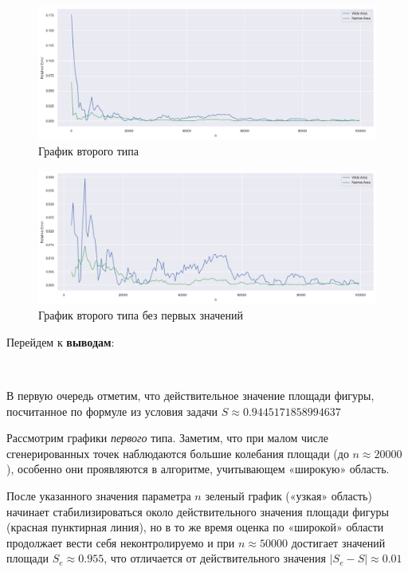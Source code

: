\documentclass[11pt,a4paper]{scrarticle}
\theoremstyle{definition}
\begin{document}
\begin{enumerate}
	      \begin{figure}[htp]
		      \centering
		      \includegraphics[width=\textwidth]{../static/relative_error.png}
		      \caption{График второго типа}
		      \label{fig:relative-error}
	      \end{figure}
	      \FloatBarrier

	      \begin{figure}[htp]
		      \centering
		      \includegraphics[width=\textwidth]{../static/relative_error_reduced.png}
		      \caption{График второго типа без первых значений}
		      \label{fig:relative-error-reduced}
	      \end{figure}
	      \FloatBarrier
\end{enumerate}

Перейдем к \textbf{выводам}:

\

В первую очередь отметим, что действительное значение площади фигуры, посчитанное по формуле из условия задачи $S \approx 0.9445171858994637$

Рассмотрим графики \emph{первого} типа. Заметим, что при малом числе сгенерированных точек наблюдаются большие колебания площади (до $n \approx 20000$), особенно они проявляются в алгоритме, учитывающем «широкую» область.

После указанного значения параметра $n$ зеленый график («узкая» область) начинает стабилизироваться около действительного значения площади фигуры (красная пунктирная линия), но в то же время оценка по «широкой» области продолжает вести себя неконтролируемо и при $n \approx 50000$ достигает значений площади $S_e \approx 0.955$, что отличается от действительного значения $|S_e - S| \approx 0.01$
\end{document}
